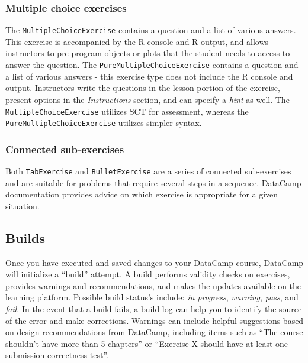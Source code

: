 \documentclass{tise_style_doi}
\begin{document}
\subsubsection{Multiple choice exercises}

The \texttt{MultipleChoiceExercise} contains a question and a list of various answers.
This exercise is accompanied by the R console and R output, and allows instructors to
pre-program objects or plots that the student needs to access to answer the question.
The \texttt{PureMultipleChoiceExercise} contains a question and a list of various
answers - this exercise type does not include the R console and output.
Instructors write the questions in the lesson portion
of the exercise, present options in the \textit{Instructions} section, and can specify a
\textit{hint} as well. The \texttt{MultipleChoiceExercise} utilizes SCT for assessment,
whereas the \texttt{PureMultipleChoiceExercise} utilizes simpler syntax.

\subsubsection{Connected sub-exercises}

Both \texttt{TabExercise} and \texttt{BulletExercise} are a series of connected
sub-exercises and are suitable for problems that require several steps in a sequence.
DataCamp documentation provides advice on which exercise is appropriate for a
given situation.

\subsection{Builds}

Once you have executed and saved changes to your DataCamp course, DataCamp will initialize
a ``build'' attempt.  A build performs validity checks on exercises, provides
warnings and recommendations, and makes the updates available on the learning
platform.  Possible build status's include: \emph{in progress}, \emph{warning},
\emph{pass}, and \emph{fail}.  In the event that a build fails, a build log
can help you to identify the source of the error and make corrections. Warnings 
can include helpful suggestions based on design recommendations from DataCamp, 
including items such as ``The course shouldn't have more than 5 chapters'' or 
``Exercise X should have at least one submission correctness test''. 
\end{document}

